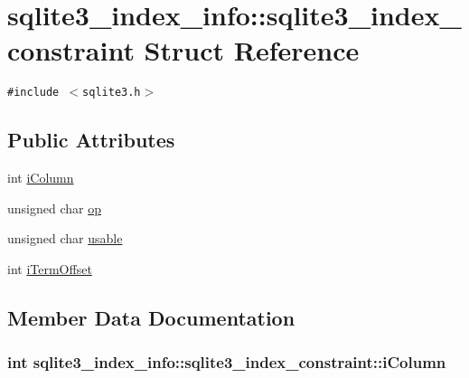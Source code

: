 \hypertarget{structsqlite3__index__info_1_1sqlite3__index__constraint}{
\section{sqlite3\_\-index\_\-info::sqlite3\_\-index\_\-constraint Struct Reference}
\label{structsqlite3__index__info_1_1sqlite3__index__constraint}
}
{\tt \#include $<$sqlite3.h$>$}

\subsection*{Public Attributes}
\begin{CompactItemize}
\item 
int \hyperlink{structsqlite3__index__info_1_1sqlite3__index__constraint_0f1e207060420058ee2881f2ea368e3a}{iColumn}
\item 
unsigned char \hyperlink{structsqlite3__index__info_1_1sqlite3__index__constraint_362f4ec1f71975cb0ac39a8b5e4b1476}{op}
\item 
unsigned char \hyperlink{structsqlite3__index__info_1_1sqlite3__index__constraint_e16e62caeab743cc68bb22227dacb501}{usable}
\item 
int \hyperlink{structsqlite3__index__info_1_1sqlite3__index__constraint_4e8368da66f34b7f07b369984b813d1b}{iTermOffset}
\end{CompactItemize}


\subsection{Member Data Documentation}
\hypertarget{structsqlite3__index__info_1_1sqlite3__index__constraint_0f1e207060420058ee2881f2ea368e3a}{
\subsubsection[iColumn]{\setlength{\rightskip}{0pt plus 5cm}int {\bf sqlite3\_\-index\_\-info::sqlite3\_\-index\_\-constraint::iColumn}}}
\label{structsqlite3__index__info_1_1sqlite3__index__constraint_0f1e207060420058ee2881f2ea368e3a}


